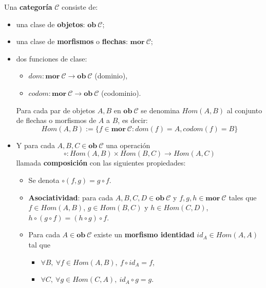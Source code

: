 \begin{definition}[Categoría]
Una \textbf{categoría} $\mathscr{C}$ consiste de:
\begin{itemize}[noitemsep,label=$\blacktriangleright$]
	\item una clase de \textbf{objetos}: $\mathbf{ob} \ \mathscr{C}$;
	\item una clase de \textbf{morfismos} o \textbf{flechas}: $\mathbf{mor} \ \mathscr{C}$;
	\item dos funciones de clase:
	\begin{itemize}[noitemsep,label=$\bullet$]
		\item $dom : \mathbf{mor} \ \mathscr{C} \rightarrow \mathbf{ob} \ \mathscr{C}$ (dominio),
		\item $codom : \mathbf{mor} \ \mathscr{C} \rightarrow \mathbf{ob} \ \mathscr{C}$ (codominio).
	\end{itemize}
	Para cada par de objetos $A, B$ en $\mathbf{ob} \ \mathscr{C}$ se denomina $Hom(A,B)$ al conjunto de flechas o morfismos de $A$ a $B$, es decir:
	\begin{equation*}
		Hom(A,B) := \{f \in \mathbf{mor} \ \mathscr{C} : dom(f) = A, codom(f) = B\}
	\end{equation*}
	\item Y para cada $A, B, C \in \mathbf{ob} \ \mathscr{C}$ una operación  
	\begin{equation*}
		\circ : Hom(A,B) \times Hom(B,C) \rightarrow Hom(A,C)
	\end{equation*}
	llamada \textbf{composición} con las siguientes propiedades: 
	\begin{itemize}[noitemsep,label=$\bullet$]
		\item Se denota $\circ(f,g) = g \circ f$.
		\item \textbf{Asociatividad}: para cada $A,B,C,D \in \mathbf{ob} \ \mathscr{C}$ y $f,g,h \in \mathbf{mor} \ \mathscr{C}$ tales que $f \in Hom(A,B)$, $g \in Hom(B,C)$ y $h \in Hom(C,D)$, \ \ $h \circ (g \circ f) = (h \circ g) \circ f$.
		\item Para cada $A \in \mathbf{ob} \ \mathscr{C}$ existe un \textbf{morfismo identidad} $id_A \in Hom(A,A)$ tal que
		\begin{itemize}[noitemsep,label=$\star$]
			\item $\forall B, \ \forall f \in Hom(A,B), \ f \circ id_A = f$,
			\item $\forall C, \ \forall g \in Hom(C,A), \ id_A \circ g = g$.
		\end{itemize}
	\end{itemize}
	
\end{itemize}
\end{definition}

